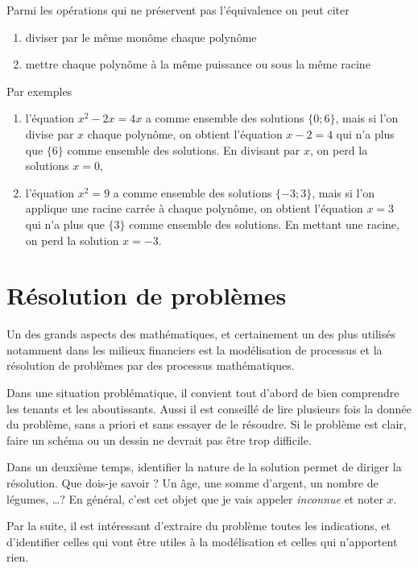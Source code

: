 \begin{remarque}
Parmi les opérations qui ne préservent pas l'équivalence on peut citer
\begin{enumerate}
\item diviser par le même monôme chaque polynôme
\item mettre chaque polynôme à la même puissance ou sous la même racine
\end{enumerate}
Par exemples
\begin{enumerate}
\item l'équation $x^2 -2x = 4x$ a comme ensemble des solutions $\{0; 6\}$, mais si l'on divise par $x$ chaque polynôme, on obtient l'équation $x-2=4$ qui n'a plus que $\{6\}$ comme ensemble des solutions. En divisant par $x$, on perd la solutions $x=0$,
\item l'équation $x^2 = 9$ a comme ensemble des solutions $\{-3;3\}$, mais si l'on applique une racine carrée à chaque polynôme, on obtient l'équation $x = 3$ qui n'a plus que $\{3\}$ comme ensemble des solutions. En mettant une racine, on perd la solution $x=-3$.
\end{enumerate}
\end{remarque}

\section{Résolution de problèmes}

Un des grands aspects des mathématiques, et certainement un des plus utilisés notamment dans les milieux financiers est la modélisation de processus et la résolution de problèmes par des processus mathématiques.

Dans une situation problématique, il convient tout d'abord de bien comprendre les tenants et les aboutissants. Aussi il est conseillé de lire plusieurs fois la donnée du problème, sans a priori et sans essayer de le résoudre. Si le problème est clair, faire un schéma ou un dessin ne devrait pas être trop difficile.

Dans un deuxième temps, identifier la nature de la solution permet de diriger la résolution. Que dois-je savoir ? Un âge, une somme d'argent, un nombre de légumes, \dots ? En général, c'est cet objet que je vais appeler \textit{inconnue} et noter $x$.

Par la suite, il est intéressant d'extraire du problème toutes les indications, et d'identifier celles qui vont être utiles à la modélisation et celles qui n'apportent rien.

